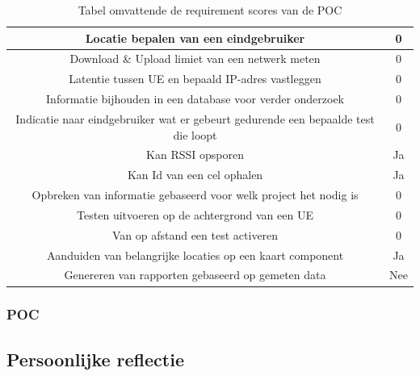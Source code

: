 \begin{table}
    \begin{tabular}{| c | c |}
        \hline
        Locatie bepalen van een eindgebruiker & 0 \\
        \hline
        Download \& Upload limiet van een netwerk meten & 0 \\
        \hline
        Latentie tussen UE en bepaald IP-adres vastleggen & 0 \\
        \hline
        Informatie bijhouden in een database voor verder onderzoek & 0 \\
        \hline
        Indicatie naar eindgebruiker wat er gebeurt gedurende een bepaalde test die loopt & 0 \\
        \hline
        Kan RSSI opsporen & Ja \\
        \hline
        Kan Id van een cel ophalen & Ja \\
        \hline
        Opbreken van informatie gebaseerd voor welk project het nodig is & 0 \\
        \hline
        Testen uitvoeren op de achtergrond van een UE & 0 \\
        \hline
        Van op afstand een test activeren & 0 \\
        \hline
        Aanduiden van belangrijke locaties op een kaart component & Ja \\
        \hline
        Genereren van rapporten gebaseerd op gemeten data & Nee \\
        \hline
    \end{tabular}
    \caption{Tabel omvattende de requirement scores van de POC}
\end{table}

\subsubsection{POC}

\subsection{Persoonlijke reflectie}